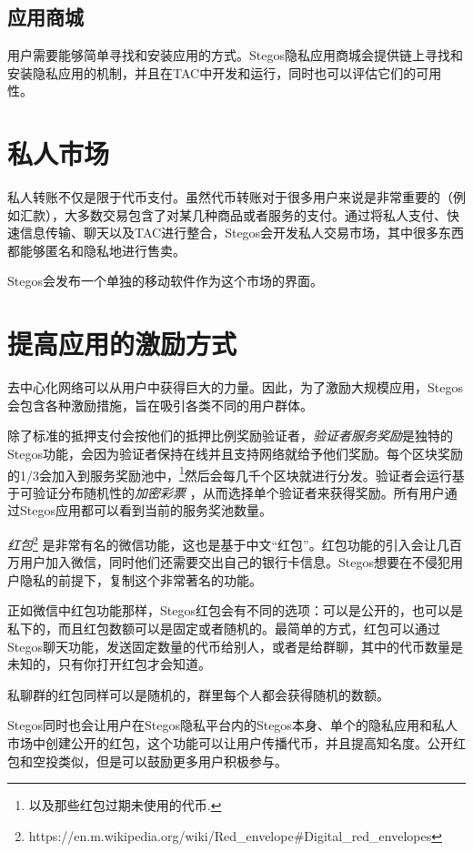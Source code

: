 \documentclass[8pt,fleqn,openany]{book}
\begin{document}
\begin{CJK*}{UTF8}{gbsn}
\subsection{应用商城} 
用户需要能够简单寻找和安装应用的方式。Stegos隐私应用商城会提供链上寻找和安装隐私应用的机制，并且在TAC中开发和运行，同时也可以评估它们的可用性。

\section{私人市场}
私人转账不仅是限于代币支付。虽然代币转账对于很多用户来说是非常重要的（例如汇款），大多数交易包含了对某几种商品或者服务的支付。通过将私人支付、快速信息传输、聊天以及TAC进行整合，Stegos会开发私人交易市场，其中很多东西都能够匿名和隐私地进行售卖。

Stegos会发布一个单独的移动软件作为这个市场的界面。

\section{提高应用的激励方式}
去中心化网络可以从用户中获得巨大的力量。因此，为了激励大规模应用，Stegos会包含各种激励措施，旨在吸引各类不同的用户群体。

除了标准的抵押支付会按他们的抵押比例奖励验证者，\textit{验证者服务奖励}是独特的Stegos功能，会因为验证者保持在线并且支持网络就给予他们奖励。每个区块奖励的1/3会加入到服务奖励池中，\footnote{以及那些红包过期未使用的代币.}然后会每几千个区块就进行分发。验证者会运行基于可验证分布随机性的\textit{加密彩票} ，从而选择单个验证者来获得奖励。所有用户通过Stegos应用都可以看到当前的服务奖池数量。

\textit{红包}\footnote{https://en.m.wikipedia.org/wiki/Red\_envelope\#Digital\_red\_envelopes} 是非常有名的微信功能，这也是基于中文“红包”。红包功能的引入会让几百万用户加入微信，同时他们还需要交出自己的银行卡信息。Stegos想要在不侵犯用户隐私的前提下，复制这个非常著名的功能。

正如微信中红包功能那样，Stegos红包会有不同的选项：可以是公开的，也可以是私下的，而且红包数额可以是固定或者随机的。最简单的方式，红包可以通过Stegos聊天功能，发送固定数量的代币给别人，或者是给群聊，其中的代币数量是未知的，只有你打开红包才会知道。

私聊群的红包同样可以是随机的，群里每个人都会获得随机的数额。

Stegos同时也会让用户在Stegos隐私平台内的Stegos本身、单个的隐私应用和私人市场中创建公开的红包，这个功能可以让用户传播代币，并且提高知名度。公开红包和空投类似，但是可以鼓励更多用户积极参与。


\end{CJK*}
\end{document}
